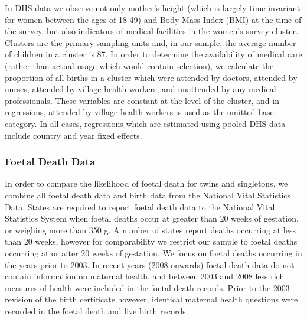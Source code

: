 \documentclass{nature}
\begin{document}
\begin{linenumbers}
In DHS data we observe not only mother's height (which is largely time invariant for women between the ages of 18-49) and  Body Mass Index (BMI) at the time of the survey, but also indicators of medical facilities in the women's survey cluster. Clusters  are the primary sampling units and, in our sample, the average number of children in a cluster is 87. In order to determine the availability of medical care (rather than actual usage which would contain selection), we calculate the proportion of all births in a cluster which were attended by doctors, attended by nurses, attended by village health workers, and unattended by any medical professionals. These variables are constant at the level of the cluster, and in regressions, attended by village health workers is used as the omitted base category.  In all cases, regressions which are estimated using pooled DHS data include country and year fixed effects. %

\subsubsection{Foetal Death Data}
In order to compare the likelihood of foetal death for twins and singletons, we combine all foetal death data and birth data from the National Vital Statistics Data.   States are required to report foetal death data to the National Vital Statistics System when foetal deaths occur at greater than 20 weeks of gestation, or weighing more than 350 g. A number of states report deaths occurring at less than 20 weeks, however for comparability we restrict our sample to foetal deaths occurring at or after 20 weeks of gestation.  We focus on foetal deaths occurring in the years prior to 2003.  In recent years (2008 onwards) foetal death data do not contain information on maternal health, and between 2003 and 2008 less rich measures of health were included in the foetal death records.  Prior to the 2003 revision of the birth certificate however, identical maternal health questions were recorded in the foetal death and live birth records.


\end{linenumbers}
\end{document}
